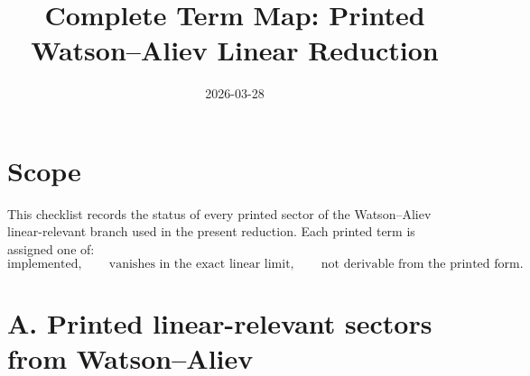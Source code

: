 \documentclass[11pt]{article}
\title{Complete Term Map: Printed Watson--Aliev Linear Reduction}
\author{}
\date{2026-03-28}
\begin{document}
\maketitle

\section*{Scope}

This checklist records the status of every printed sector of the Watson--Aliev linear-relevant branch used in the present reduction. Each printed term is assigned one of:
\[
\text{implemented},\qquad
\text{vanishes in the exact linear limit},\qquad
\text{not derivable from the printed form}.
\]

\section*{A. Printed linear-relevant sectors from Watson--Aliev}
\end{document}
